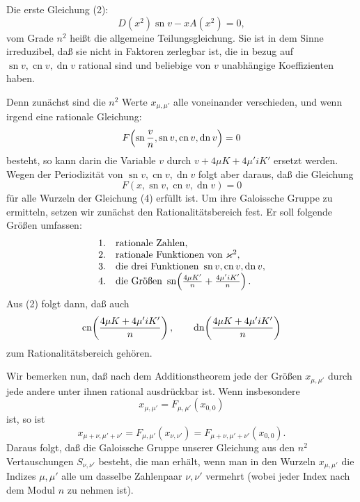 \documentclass[11pt]{article}
\providecommand{\sn}{\operatorname{sn}}
\providecommand{\cn}{\operatorname{cn}}
\providecommand{\dn}{\operatorname{dn}}
\begin{document}
Die erste Gleichung (2):
\begin{equation}
D(x^2)\sn v-xA(x^2)=0,
\tag{4}
\end{equation}
vom Grade $n^2$ heißt die allgemeine Teilungsgleichung. Sie ist in dem Sinne irreduzibel,
daß sie nicht in Faktoren zerlegbar ist, die in bezug auf $\sn v,\cn v,\dn v$ rational sind und
beliebige von $v$ unabhängige Koeffizienten haben.

Denn zunächst sind die $n^2$ Werte $x_{\mu,\mu'}$ alle voneinander verschieden, und wenn
irgend eine rationale Gleichung:
\[
F\!\left(\sn {v\over n},\sn v,\cn v,\dn v\right)=0
\]
besteht, so kann darin die Variable $v$ durch $v+4\mu K+4\mu'iK'$ ersetzt werden. Wegen
der Periodizität von $\sn v,\cn v,\dn v$ folgt aber daraus, daß die Gleichung
\[
F(x,\sn v,\cn v,\dn v)=0
\]
für alle Wurzeln der Gleichung (4) erfüllt ist. Um ihre Galoissche Gruppe zu ermitteln,
setzen wir zunächst den Rationalitätsbereich fest. Er soll folgende Größen umfassen:
\[
\begin{array}{ll}
1.& \text{rationale Zahlen,}\\
2.& \text{rationale Funktionen von }\varkappa^2,\\
3.& \text{die drei Funktionen }\sn v,\cn v,\dn v,\\
4.& \text{die Größen }\sn\!\left({4\mu K'\over n}+{4\mu'iK'\over n}\right).
\end{array}
\]
Aus (2) folgt dann, daß auch
\[
\cn\!\left({4\mu K+4\mu'iK'\over n}\right),\qquad
\dn\!\left({4\mu K+4\mu'iK'\over n}\right)
\]
zum Rationalitätsbereich gehören.

Wir bemerken nun, daß nach dem Additionstheorem jede der Größen $x_{\mu,\mu'}$ durch
jede andere unter ihnen rational ausdrückbar ist. Wenn insbesondere
\begin{equation}
x_{\mu,\mu'}=F_{\mu,\mu'}(x_{0,0})
\tag{5}
\end{equation}
ist, so ist
\begin{equation}
x_{\mu+\nu,\mu'+\nu'}=F_{\mu,\mu'}(x_{\nu,\nu'})
=F_{\mu+\nu,\mu'+\nu'}(x_{0,0}).
\tag{6}
\end{equation}
Daraus folgt, daß die Galoissche Gruppe unserer Gleichung aus den $n^2$ Vertauschungen
$S_{\nu,\nu'}$ besteht, die man erhält, wenn man in den Wurzeln $x_{\mu,\mu'}$ die Indizes
$\mu,\mu'$ alle um dasselbe Zahlenpaar $\nu,\nu'$ vermehrt (wobei jeder Index nach dem
Modul $n$ zu nehmen ist).
\end{document}
